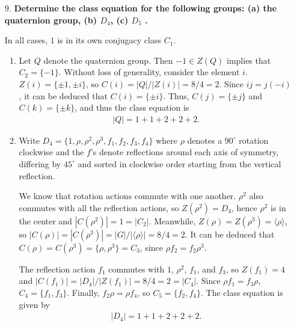 \documentclass[a4paper,12pt]{article}
\begin{document}
\begin{enumerate}
    \item[9.]
        \boldmath
        \textbf{Determine the class equation for the following groups: (a) the quaternion group, (b) $D_4$, (c) $D_5$ \iffalse, (d) the subgroup of $GL_2(\mathbb{F}_3)$ of invertible upper triangular matrices \fi.} \par
        \unboldmath
        In all cases, $1$ is in its own conjugacy class $C_1$.
        \begin{enumerate}
            \item
                Let $Q$ denote the quaternion group. Then $-1 \in Z(Q)$ implies that $C_2 = \{ -1 \}$. Without loss of generality, consider the element $i$. $Z(i) = \{ \pm 1, \pm i \}$, so $C(i) = |Q|/|Z(i)| = 8/4 = 2$. Since $ij = j(-i)$, it can be deduced that $C(i) = \{ \pm i \}$. Thus, $C(j) = \{ \pm j \}$ and $C(k) = \{ \pm k \}$, and thus the class equation is
                \begin{align*}
                    |Q| = 1 + 1 + 2 + 2 + 2.
                \end{align*}

            \item
                Write $D_4 = \{ 1, \rho, \rho^2, \rho^3, f_1, f_2, f_3, f_4 \}$ where $\rho$ denotes a $90^\circ$ rotation clockwise and the $f$'s denote reflections around each axis of symmetry, differing by $45^\circ$ and sorted in clockwise order starting from the vertical reflection. \par
                We know that rotation actions commute with one another. $\rho^2$ also commutes with all the reflection actions, so $Z(\rho^2) = D_4$, hence $\rho^2$ is in the center and $|C(\rho^2)| = 1 = |C_2|$. Meanwhile, $Z(\rho) = Z(\rho^3) = \langle \rho \rangle$, so $|C(\rho)| = |C(\rho^3)| = |G|/|\langle \rho \rangle| = 8/4 = 2$. It can be deduced that $C(\rho) = C(\rho^3) = \{ \rho, \rho^3 \} = C_3$, since $\rho f_2 = f_2 \rho^3$. \par
                The reflection action $f_1$ commutes with $1$, $\rho^2$, $f_1$, and $f_3$, so $Z(f_1) = 4$ and $|C(f_1)| = |D_4|/|Z(f_1)| = 8/4 = 2 = |C_4|$. Since $\rho f_1 = f_3 \rho$, $C_4 = \{ f_1, f_3 \}$. Finally, $f_2 \rho = \rho f_4$, so $C_5 = \{ f_2, f_4 \}$. The class equation is given by
                \begin{align*}
                    |D_4| = 1 + 1 + 2 + 2 + 2.
                \end{align*}


\end{enumerate}
\end{enumerate}
\end{document}
